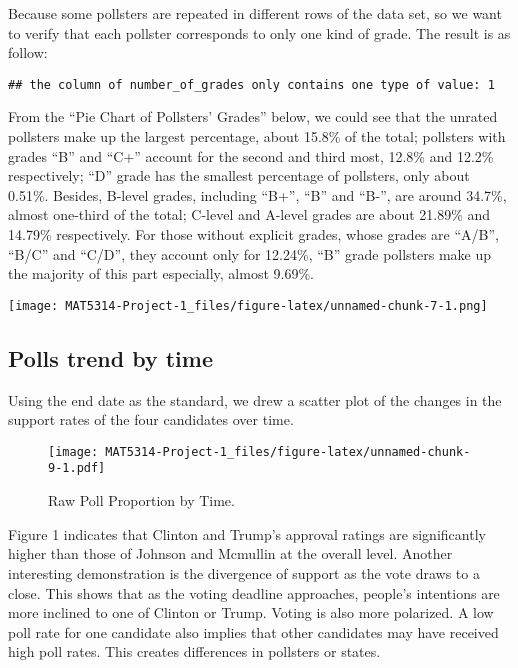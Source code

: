 \documentclass[
]{article}
\begin{document}
Because some pollsters are repeated in different rows of the data set,
so we want to verify that each pollster corresponds to only one kind of
grade. The result is as follow:

\begin{verbatim}
## the column of number_of_grades only contains one type of value: 1
\end{verbatim}

From the ``Pie Chart of Pollsters' Grades'' below, we could see that the
unrated pollsters make up the largest percentage, about 15.8\% of the
total; pollsters with grades ``B'' and ``C+'' account for the second and
third most, 12.8\% and 12.2\% respectively; ``D'' grade has the smallest
percentage of pollsters, only about 0.51\%. Besides, B-level grades,
including ``B+'', ``B'' and ``B-'', are around 34.7\%, almost one-third
of the total; C-level and A-level grades are about 21.89\% and 14.79\%
respectively. For those without explicit grades, whose grades are
``A/B'', ``B/C'' and ``C/D'', they account only for 12.24\%, ``B'' grade
pollsters make up the majority of this part especially, almost 9.69\%.

\texttt{[image: MAT5314-Project-1\_files/figure-latex/unnamed-chunk-7-1.png]}

\hypertarget{polls-trend-by-time}{%
\subsection{Polls trend by time}\label{polls-trend-by-time}}

Using the end date as the standard, we drew a scatter plot of the
changes in the support rates of the four candidates over time.

\begin{figure}
\centering
\texttt{[image: MAT5314-Project-1\_files/figure-latex/unnamed-chunk-9-1.pdf]}
\caption{Raw Poll Proportion by Time.}
\end{figure}

Figure 1 indicates that Clinton and Trump's approval ratings are
significantly higher than those of Johnson and Mcmullin at the overall
level. Another interesting demonstration is the divergence of support as
the vote draws to a close. This shows that as the voting deadline
approaches, people's intentions are more inclined to one of Clinton or
Trump. Voting is also more polarized. A low poll rate for one candidate
also implies that other candidates may have received high poll rates.
This creates differences in pollsters or states.
\end{document}
